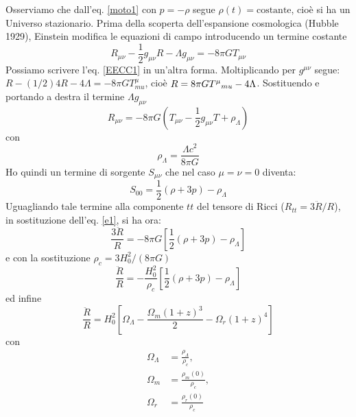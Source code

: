 Osserviamo che dall'eq. \eqref{moto1} con $p=-\rho$ segue
$\rho(t)=\text{costante}$, cioè si ha un Universo stazionario.  Prima della
scoperta dell'espansione cosmologica (Hubble 1929), Einstein modifica le
equazioni di campo introducendo un termine costante
\begin{equation}
  R_{\mu \nu} - \frac{1}{2} g_{\mu \nu} R - \Lambda g_{\mu \nu} =
  - 8 \pi G T_{\mu \nu}
  \label{EECC1}
\end{equation}
Possiamo scrivere l'eq. \eqref{EECC1} in un'altra forma.  Moltiplicando per
$g^{\mu \nu}$ segue: $R - (1/2) 4 R - 4\Lambda = -8 \pi G T^{\mu}_{mu}$, cioè
$R=8 \pi G \tensor{T}{^{\mu}}{_{mu}} -4 \Lambda$.  Sostituendo e portando a
destra il termine $\Lambda g_{\mu \nu}$
\begin{equation}
  R_{\mu \nu} = - 8 \pi G
  \left(
    T_{\mu \nu} - \frac {1}{2} g_{\mu \nu} T + \rho_{\Lambda}
  \right)
  \label{EECC2}
\end{equation}
con
\begin{equation}
  \rho_{\Lambda} = \frac {\Lambda c^2} {8 \pi G}
\end{equation}
Ho quindi un termine di sorgente $S_{\mu \nu}$ che nel caso $\mu=\nu=0$ diventa:
\begin{equation}
  S_{00} = \frac {1}{2} (\rho+3p) - \rho_{\Lambda}
\end{equation}
Uguagliando tale termine alla componente $tt$ del tensore di Ricci
($R_{tt}= 3 \ddot{R}/R$), in sostituzione dell'eq. \eqref{e1}, si ha ora:
\begin{equation}
  \frac{3 \ddot{R}}{R} = - 8\pi G \left[ \frac{1}{2}  (\rho+3p) - \rho_{\Lambda}
  \right]
  \label{ecc1}
\end{equation}
e con la sostituzione $\rho_c=3H_0^2/(8\pi G)$
\begin{equation}
  \frac {\ddot{R}} {R} = - \frac {H_0^2} {\rho_c}
  \left[
    \frac {1}{2}  (\rho+3p) - \rho_{\Lambda}
  \right]
\end{equation}
ed infine
\begin{equation}
  \label{ddRcc}
  \frac {\ddot{R}} {R} = H_0^2
  \left[
    \Omega_{\Lambda} -\frac {\Omega_m (1+z)^3} {2 }  - \Omega_r (1+z)^4
  \right]
\end{equation}
con
\begin{subequations}
  \begin{align}
    \Omega_{\Lambda} & = \frac{\rho_{\Lambda}}{\rho_c}, \\
    \Omega_m         & = \frac{\rho_m(0)}{\rho_c}, \\
    \Omega_r         & = \frac{\rho_r(0)}{\rho_c}
  \end{align}
\end{subequations}

